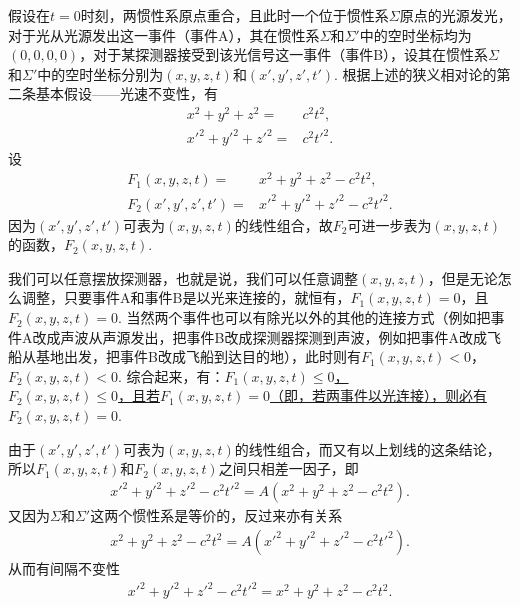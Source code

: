 \documentclass{assignment}
\begin{document}
假设在$t=0$时刻，两惯性系原点重合，且此时一个位于惯性系$\Sigma$原点的光源发光，对于光从光源发出这一事件（事件A），其在惯性系$\Sigma$和$\Sigma'$中的空时坐标均为$(0,0,0,0)$，对于某探测器接受到该光信号这一事件（事件B），设其在惯性系$\Sigma$和$\Sigma'$中的空时坐标分别为$(x,y,z,t)$和$(x',y',z',t')$. 根据上述的狭义相对论的第二条基本假设——光速不变性，有
\begin{align}
    x^2+y^2+z^2=&c^2t^2,\\
    x'^2+y'^2+z'^2=&c^2t'^2.
\end{align}
设
\begin{align}
    F_1(x,y,z,t)=&x^2+y^2+z^2-c^2t^2,\\
    F_2(x',y',z',t')=&x'^2+y'^2+z'^2-c^2t'^2.
\end{align}
因为$(x',y',z',t')$可表为$(x,y,z,t)$的线性组合，故$F_2$可进一步表为$(x,y,z,t)$的函数，$F_2(x,y,z,t)$.

我们可以任意摆放探测器，也就是说，我们可以任意调整$(x,y,z,t)$，但是无论怎么调整，只要事件A和事件B是以光来连接的，就恒有，$F_1(x,y,z,t)=0$，且$F_2(x,y,z,t)=0$. 当然两个事件也可以有除光以外的其他的连接方式（例如把事件A改成声波从声源发出，把事件B改成探测器探测到声波，例如把事件A改成飞船从基地出发，把事件B改成飞船到达目的地），此时则有$F_1(x,y,z,t)<0$，$F_2(x,y,z,t)<0$. 综合起来，有：\uline{$F_1(x,y,z,t)\leq 0$，\\$F_2(x,y,z,t)\leq 0$，且若$F_1(x,y,z,t)=0$（即，若两事件以光连接），则必有$F_2(x,y,z,t)=0$}.

由于$(x',y',z',t')$可表为$(x,y,z,t)$的线性组合，而又有以上划线的这条结论，所以$F_1(x,y,z,t)$和$F_2(x,y,z,t)$之间只相差一因子，即
\begin{align}
    x'^2+y'^2+z'^2-c^2t'^2=A(x^2+y^2+z^2-c^2t^2).
\end{align}
又因为$\Sigma$和$\Sigma'$这两个惯性系是等价的，反过来亦有关系
\begin{align}
    x^2+y^2+z^2-c^2t^2=A(x'^2+y'^2+z'^2-c^2t'^2).
\end{align}
从而有间隔不变性
\begin{align}
    \label{gap-const}
    x'^2+y'^2+z'^2-c^2t'^2=x^2+y^2+z^2-c^2t^2.
\end{align}
\end{document}
